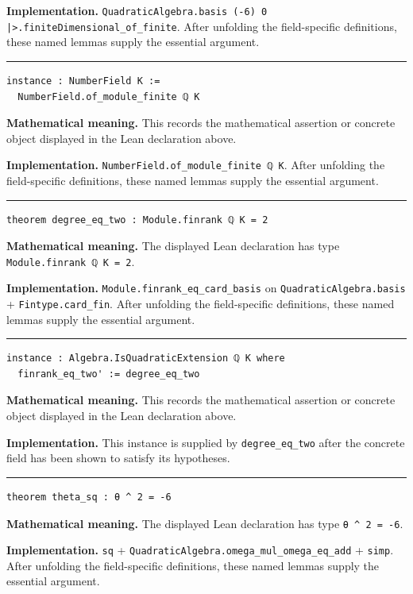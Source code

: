 \documentclass[UTF8,a4paper,11pt,fontset=fandol]{ctexart}
\theoremstyle{definition}
\newcommand{\statementsep}{\par\medskip\hrule\medskip}
\begin{document}
\noindent\textbf{Implementation.} \texttt{QuadraticAlgebra.\allowbreak{}basis (-6) 0 |>.\allowbreak{}finiteDimensional\_\allowbreak{}of\_\allowbreak{}finite}. After unfolding the field-specific definitions, these named lemmas supply the essential argument.\par
\statementsep
\begin{verbatim}
instance : NumberField K :=
  NumberField.of_module_finite ℚ K
\end{verbatim}
\noindent\textbf{Mathematical meaning.} This records the mathematical assertion or concrete object displayed in the Lean declaration above.\par
\noindent\textbf{Implementation.} \texttt{NumberField.\allowbreak{}of\_\allowbreak{}module\_\allowbreak{}finite ℚ K}. After unfolding the field-specific definitions, these named lemmas supply the essential argument.\par
\statementsep
\begin{verbatim}
theorem degree_eq_two : Module.finrank ℚ K = 2
\end{verbatim}
\noindent\textbf{Mathematical meaning.} The displayed Lean declaration has type \texttt{Module.\allowbreak{}finrank ℚ K = 2}.\par
\noindent\textbf{Implementation.} \texttt{Module.\allowbreak{}finrank\_\allowbreak{}eq\_\allowbreak{}card\_\allowbreak{}basis} on \texttt{QuadraticAlgebra.\allowbreak{}basis} + \texttt{Fintype.\allowbreak{}card\_\allowbreak{}fin}. After unfolding the field-specific definitions, these named lemmas supply the essential argument.\par
\statementsep
\begin{verbatim}
instance : Algebra.IsQuadraticExtension ℚ K where
  finrank_eq_two' := degree_eq_two
\end{verbatim}
\noindent\textbf{Mathematical meaning.} This records the mathematical assertion or concrete object displayed in the Lean declaration above.\par
\noindent\textbf{Implementation.} This instance is supplied by \texttt{degree\_\allowbreak{}eq\_\allowbreak{}two} after the concrete field has been shown to satisfy its hypotheses.\par
\statementsep
\begin{verbatim}
theorem theta_sq : θ ^ 2 = -6
\end{verbatim}
\noindent\textbf{Mathematical meaning.} The displayed Lean declaration has type \texttt{θ \textasciicircum{} 2 = -6}.\par
\noindent\textbf{Implementation.} \texttt{sq} + \texttt{QuadraticAlgebra.\allowbreak{}omega\_\allowbreak{}mul\_\allowbreak{}omega\_\allowbreak{}eq\_\allowbreak{}add} + \texttt{simp}. After unfolding the field-specific definitions, these named lemmas supply the essential argument.\par
\end{document}
